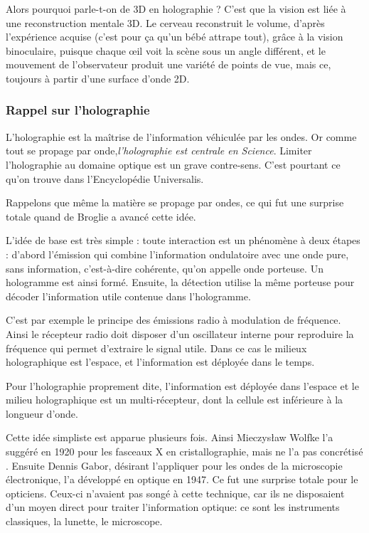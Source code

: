 \documentclass[a4paper,12pt]{article}
\begin{document}
Alors pourquoi parle-t-on de 3D en holographie ? C'est que la vision est liée à une reconstruction mentale 3D. Le cerveau reconstruit le volume, d'après l'expérience acquise (c'est pour ça qu'un bébé attrape tout), grâce à la vision binoculaire, puisque chaque œil voit la scène sous un angle différent, et le mouvement de l'observateur produit une variété de points de vue, mais ce, toujours à partir d'une surface d'onde 2D.



\subsubsection{Rappel sur l'holographie}

L'holographie est la ma\^itrise de l'information véhiculée par les ondes. Or comme tout se propage par onde,\textit {l'holographie est centrale en Science}. Limiter l'holographie au domaine optique est un grave contre-sens. C'est pourtant ce qu'on trouve dans l'Encyclopédie Universalis. 



Rappelons que même la matière se propage par ondes, ce qui fut une surprise totale quand de Broglie a avancé cette idée. 



L'idée de base est très simple : toute interaction est un phénomène à deux étapes : d'abord l'émission qui combine l'information ondulatoire avec une onde pure, sans information, c'est-à-dire cohérente, qu'on appelle onde porteuse. Un hologramme est ainsi formé. Ensuite, la détection utilise la même porteuse pour décoder l'information utile contenue dans l'hologramme.


C'est par exemple le principe des émissions radio à modulation de fréquence. Ainsi le récepteur radio doit disposer d'un oscillateur interne pour reproduire la fréquence qui permet d'extraire le signal utile. Dans ce cas le milieux holographique est l'espace, et l'information est déployée dans le temps.


Pour l'holographie proprement dite, l'information est déployée dans l'espace et le milieu holographique est un multi-récepteur, dont la cellule est inférieure à la longueur d'onde.


Cette idée simpliste est apparue plusieurs fois. Ainsi Mieczysław Wolfke l'a suggéré en 1920 pour les fasceaux X en cristallographie, mais ne l'a pas concrétisé \cite{Gabor}. Ensuite Dennis Gabor, désirant l'appliquer pour les ondes de la microscopie électronique, l'a développé en optique en 1947. Ce fut une surprise totale pour le opticiens. Ceux-ci n'avaient pas songé à cette technique, car ils ne disposaient d'un moyen direct pour traiter l'information optique: ce sont les instruments classiques, la lunette, le microscope.
\end{document}
